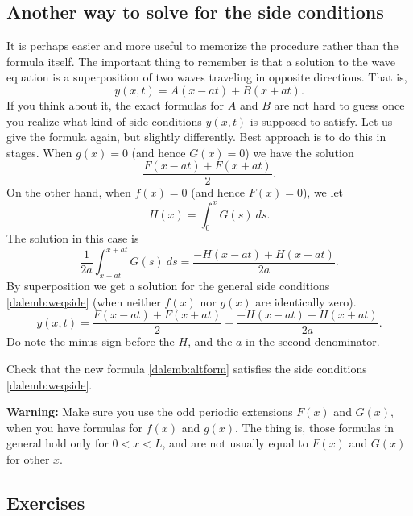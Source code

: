 \subsection{Another way to solve for the side conditions}

It is perhaps easier and more useful
to memorize the procedure rather than the formula
itself.  The important thing to remember is that a solution to the wave
equation is a superposition of two waves traveling in opposite directions.
That is,
\begin{equation*}
y(x,t) = A(x-at) + B(x+at) .
\end{equation*}
If you think about it, the exact formulas for $A$ and $B$ are not hard
to guess once you realize what kind of side conditions $y(x,t)$ is supposed to
satisfy.  Let us give the formula again, but slightly differently.
Best approach is to do this in stages.  When $g(x) = 0$ (and hence
$G(x) = 0$) we have the solution
\begin{equation*}
\frac{ F(x-at) + F(x+at) }{2} .
\end{equation*}
On the other hand,
when $f(x) = 0$ (and hence $F(x) = 0$), we let
\begin{equation*}
H(x) = \int_0^x G(s) ~ds .
\end{equation*}
The solution in this case is
\begin{equation*}
\frac{1}{2a} \int_{x-at}^{x+at} G(s) ~ds
=
\frac{ -H(x-at) + H(x+at) }{2a} .
\end{equation*}
By superposition we get a solution for the general side conditions
\eqref{dalemb:weqside} (when neither $f(x)$ nor $g(x)$ are identically zero).
\begin{equation} \label{dalemb:altform}
y(x,t) = \frac{ F(x-at) + F(x+at) }{2} +
\frac{ -H(x-at) + H(x+at) }{2a} .
\end{equation}
Do note the minus sign before the $H$, and the $a$ in the second denominator.

\begin{exercise}
Check that the new formula \eqref{dalemb:altform} satisfies
the side conditions
\eqref{dalemb:weqside}.
\end{exercise}

\textbf{Warning:}  Make sure you use the odd periodic extensions $F(x)$ and $G(x)$,
when you have formulas for $f(x)$ and $g(x)$.
The thing is, those formulas in general hold
only for $0 < x < L$, and are not usually equal to $F(x)$ and $G(x)$
for other $x$.

\subsection{Exercises}

